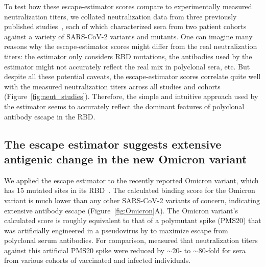 \documentclass[9pt,twocolumn,twoside]{gsajnl_modified}
\begin{document}
To test how these escape-estimator scores compare to experimentally measured neutralization titers, we collated neutralization data from three previously published studies~\citep{lucas2021impact,uriu2021neutralization,wang2021antibody}, each of which characterized sera from two patient cohorts against a variety of SARS-CoV-2 variants and mutants.
One can imagine many reasons why the escape-estimator scores might differ from the real neutralization titers: the estimator only considers RBD mutations, the antibodies used by the estimator might not accurately reflect the real mix in polyclonal sera, etc.
But despite all these potential caveats, the escape-estimator scores correlate quite well with the measured neutralization titers across all studies and cohorts (Figure~\ref{fig:neut_studies}).
Therefore, the simple and intuitive approach used by the estimator seems to accurately reflect the dominant features of polyclonal antibody escape in the RBD.

\subsection{The escape estimator suggests extensive antigenic change in the new Omicron variant}
We applied the escape estimator to the recently reported Omicron variant, which has 15 mutated sites in its RBD~\citep{ngs-sa2021update,deoliveira2021tweet}.
The calculated binding score for the Omicron variant is much lower than any other SARS-CoV-2 variants of concern, indicating extensive antibody escape (Figure~\ref{fig:Omicron}A).
The Omicron variant's calculated score is roughly equivalent to that of a polymutant spike (PMS20) that was artificially engineered in a pseudovirus by \citet{schmidt2021high} to maximize escape from polyclonal serum antibodies.
For comparison, \citet{schmidt2021high} measured that neutralization titers against this artificial PMS20 spike were reduced by $\sim$20- to $\sim$80-fold for sera from various cohorts of vaccinated and infected individuals.
\end{document}

